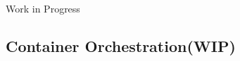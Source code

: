 \documentclass{article}
\begin{document}
\noindent\makebox[\textwidth]{\rule{\textwidth}{7pt}} Work in Progress

\subsection{Container Orchestration(WIP)}

\end{document}
